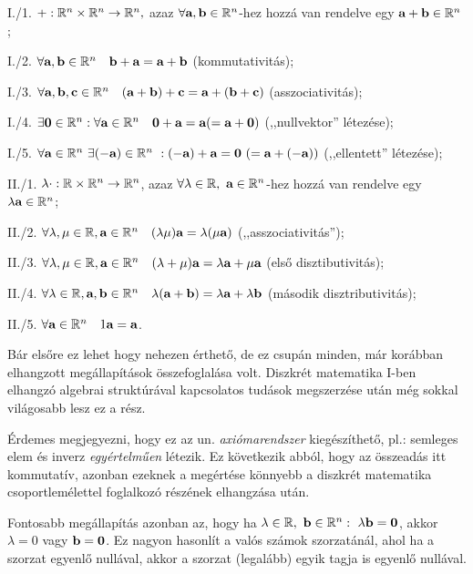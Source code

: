 \documentclass[a4paper,11.5pt]{article}
\begin{document}
	\smallskip
	\noindent I./1. $+: \mathbb{R}^{n} \times  \mathbb{R}^{n}  \rightarrow  \mathbb{R}^{n},$ azaz
	$\forall \textbf{a}, \textbf{b} \in  \mathbb{R}^{n}$-hez hozzá van rendelve egy $\textbf{a} + \textbf{b} \in
	 \mathbb{R}^{n}$ ; 
	
	\smallskip
	\noindent I./2. $\forall \textbf{a}, \textbf{b} \in  \mathbb{R}^{n}  \quad \textbf{b} + \textbf{a} =\textbf{a} +
	\textbf{b}$ (kommutativitás);  
	
	\smallskip
	\noindent I./3. $\forall \textbf{a}, \textbf{b}, \textbf{c} \in  \mathbb{R}^{n}  \quad (\textbf{a} + \textbf{b} )+ \textbf{c} = \textbf{a} +
	(\textbf{b} + \textbf{c})$ (asszociativitás);
	
	\smallskip
	\noindent I./4. $\exists \textbf{0} \in   \mathbb{R}^{n}   :  \forall \textbf{a} \in  \mathbb{R}^{n}  \quad
	\textbf{0}+\textbf{a} =\textbf{a} (=\textbf{a} +\textbf{0})$ (,,nullvektor'' létezése);
	
	\smallskip
	\noindent I./5. $\forall \textbf{a} \in  \mathbb{R}^{n}~ \exists (-\textbf{a} )\in  \mathbb{R}^{n}~   : 
	(-\textbf{a} )+\textbf{a} =\textbf{0}~ (=\textbf{a}+(-\textbf{a} ))$ (,,ellentett'' létezése);
	
	\smallskip
	\noindent II./1. $\lambda \cdot :   \mathbb{R}  \times  \mathbb{R}^{n}  \rightarrow  \mathbb{R}^{n}$, azaz
	$\forall \lambda \in  \mathbb{R},~\textbf{a} \in  \mathbb{R}^{n}$-hez hozzá van rendelve egy $\lambda
	\textbf{a} \in  \mathbb{R}^{n}$; 
	
	\smallskip
	\noindent II./2. $\forall \lambda, \mu \in  \mathbb{R} , \textbf{a} \in  \mathbb{R}^{n}  \quad (\lambda \mu )\textbf{a} =\lambda
	(\mu \textbf{a} )$ (,,asszociativitás'');
	
	\smallskip
	\noindent II./3. $\forall \lambda, \mu \in  \mathbb{R} , \textbf{a} \in  \mathbb{R}^{n}  \quad (\lambda +\mu )\textbf{a} =\lambda
	\textbf{a} +\mu \textbf{a}$ (első disztibutivitás);
	
	\smallskip
	\noindent II./4. $\forall \lambda \in  \mathbb{R} , \textbf{a} , \textbf{b} \in  \mathbb{R}^{n}  \quad \lambda (\textbf{a} +\textbf{b} )=\lambda
	\textbf{a} +\lambda \textbf{b} $ (második disztributivitás);
	
	\smallskip
	\noindent II./5. $\forall \textbf{a} \in  \mathbb{R}^{n}  \quad 1\textbf{a} =\textbf{a} $.
	
	\medskip 
	Bár elsőre ez lehet hogy nehezen érthető, de ez csupán minden, már korábban elhangzott megállapítások összefoglalása volt. Diszkrét matematika I-ben elhangzó algebrai struktúrával kapcsolatos tudások megszerzése után még sokkal világosabb lesz ez a rész.
	
	Érdemes megjegyezni, hogy ez az un. \textit{axiómarendszer} kiegészíthető, pl.: semleges elem és inverz \emph{egyértelműen} létezik. Ez következik abból, hogy az összeadás itt kommutatív, azonban ezeknek a megértése könnyebb a diszkrét matematika csoportlemélettel foglalkozó részének elhangzása után.
	
	Fontosabb megállapítás azonban az, hogy ha $\lambda \in \mathbb{R},~\textbf{b} \in \mathbb{R}^{n}: ~\lambda\textbf{b}=\textbf{0}$, akkor $\lambda=0$ vagy $\textbf{b}=\textbf{0}$. Ez nagyon hasonlít a valós számok szorzatánál, ahol ha a szorzat egyenlő nullával, akkor a szorzat (legalább) egyik tagja is egyenlő nullával.
	
\end{document}
